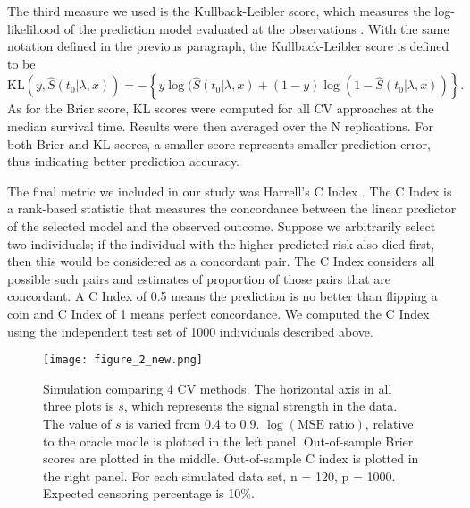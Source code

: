 \par The third measure we used is the Kullback-Leibler score, which measures the log-likelihood of the prediction model evaluated at the observations \citep{VanHouwelingen2011}. With the same notation defined in the previous paragraph, the Kullback-Leibler score is defined to be
\begin{equation}
	\text{KL}(y, \hat{S}(t_0|\lambda,x)) = -\left\{ y\log(\hat{S}(t_0|\lambda,x) + (1 - y)\log(1 - \hat{S}(t_0|\lambda,x)) \right\}.
\end{equation}
As for the Brier score, KL scores were computed for all CV approaches at the median survival time.  Results were then averaged over the N replications. For both Brier and KL scores, a smaller score represents smaller prediction error, thus indicating better prediction accuracy.

\par The final metric we included in our study was Harrell's C Index \citep{HarrellJr1984}. The C Index is a rank-based statistic that measures the concordance between the linear predictor of the selected model and the observed outcome. Suppose we arbitrarily select two individuals; if the individual with the higher predicted risk also died first, then this would be considered as a concordant pair. The C Index considers all possible such pairs and estimates of proportion of those pairs that are concordant. A C Index of 0.5 means the prediction is no better than flipping a coin and C Index of 1 means perfect concordance. We computed the C Index using the independent test set of 1000 individuals described above.

\begin{figure}[ht]
  \centering
  \texttt{[image: figure\_2\_new.png]}
  \caption{\label{Fig:mse-brier-c} Simulation comparing 4 CV methods. The horizontal axis in all three plots is $s$, which represents the signal strength in the data. The value of $s$ is varied from 0.4 to 0.9.  $\log(\text{MSE ratio})$, relative to the oracle modle is plotted in the left panel. Out-of-sample Brier scores are plotted in the middle. Out-of-sample C index is plotted in the right panel. For each simulated data set, n = 120, p = 1000. Expected censoring percentage is 10$\%$.}
\end{figure}	

